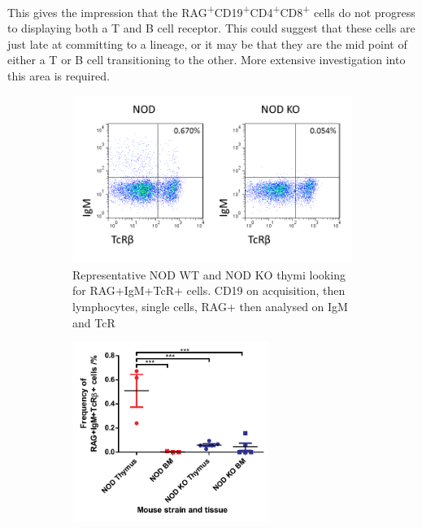 This gives the impression that the RAG\textsuperscript{+}CD19\textsuperscript{+}CD4\textsuperscript{+}CD8\textsuperscript{+} cells do not progress to displaying both a T and B cell receptor.
This could suggest that these cells are just late at committing to a lineage, or it may be that they are the mid point of either a T or B cell transitioning to the other.
More extensive investigation into this area is required.


\begin{figure}
	\begin{subfigure}{\textwidth}
	\includegraphics[width=\textwidth]{Figures/NODKOIgMTcR.png}
	\caption{Representative NOD WT and NOD KO thymi looking for RAG+IgM+TcR+ cells. CD19 on acquisition, then lymphocytes, single cells, RAG+ then analysed on IgM and TcR}
	\label{subfig:BMvThyRAGIgMTcR}
	\end{subfigure}
	\begin{subfigure}{\textwidth}
	\centering
	\includegraphics[width=0.7\textwidth]{Figures/IgMTcR.pdf}

\end{subfigure}
\end{figure}
